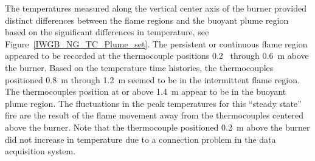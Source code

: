 \documentclass[twoside]{uocthesis}
\begin{document}
{The temperatures measured along the vertical center axis of the burner provided distinct differences between the flame regions and the buoyant plume region based on the significant differences in temperature, see Figure~\ref{IWGB_NG_TC_Plume_set}.  The persistent or continuous flame region appeared to be recorded at the thermocouple positions 0.2~ through 0.6~m above the burner.  Based on the temperature time histories, the thermocouples positioned 0.8~m through 1.2~m seemed to be in the intermittent flame region.  The thermocouples position at or above 1.4~m appear to be in the buoyant plume region.  The fluctuations in the peak temperatures for this ``steady state'' fire are the result of the flame movement away from the thermocouples centered above the burner.  Note that the thermocouple positioned 0.2~m above the burner did not increase in temperature due to a connection problem in the data acquisition system.            

}
\end{document}
